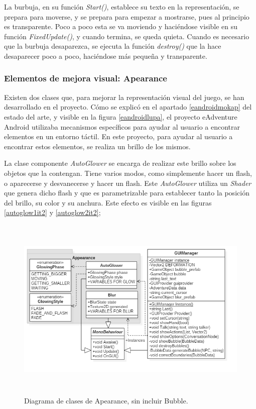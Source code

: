 La burbuja, en su función \textit{Start()}, establece su texto en la representación, se prepara para moverse, y se prepara para empezar a mostrarse, pues al principio es transparente. Poco a poco esta se va moviendo y haciéndose visible en su función \textit{FixedUpdate()}, y cuando termina, se queda quieta. Cuando es necesario que la burbuja desaparezca, se ejecuta la función \textit{destroy()} que la hace desaparecer poco a poco, haciéndose más pequeña y transparente.

\subsubsection{Elementos de mejora visual: Apearance}
\label{apearanceseccionit2}

Existen dos clases que, para mejorar la representación visual del juego, se han desarrollado en el proyecto. Cómo se explicó en el apartado \ref{eandroidmokap} del estado del arte, y visible en la figura \ref{eandroidlupa}, el proyecto eAdventure Android utilizaba mecanismos específicos para ayudar al usuario a encontrar elementos en un entorno táctil. En este proyecto, para ayudar al usuario a encontrar estos elementos, se realiza un brillo de los mismos.

La clase componente \textit{AutoGlower} se encarga de realizar este brillo sobre los objetos que la contengan. Tiene varios modos, como simplemente hacer un flash, o aparecerse y desvanecerse y hacer un flash. Este \textit{AutoGlower} utiliza un \textit{Shader} que genera dicho flash y que es parametrizable para establecer tanto la posición del brillo, su color y su anchura. Este efecto es visible en las figuras \ref{autoglow1it2} y \ref{autoglow2it2};

\begin{figure}[h!]
	\centerline{\includegraphics[height=3.5in]{figures/it2/Apearance.png}}
	\caption[Apearance - Versión Final]{Diagrama de clases de Apearance, sin incluir Bubble.}
	\label{apearanceit2}
\end{figure}

